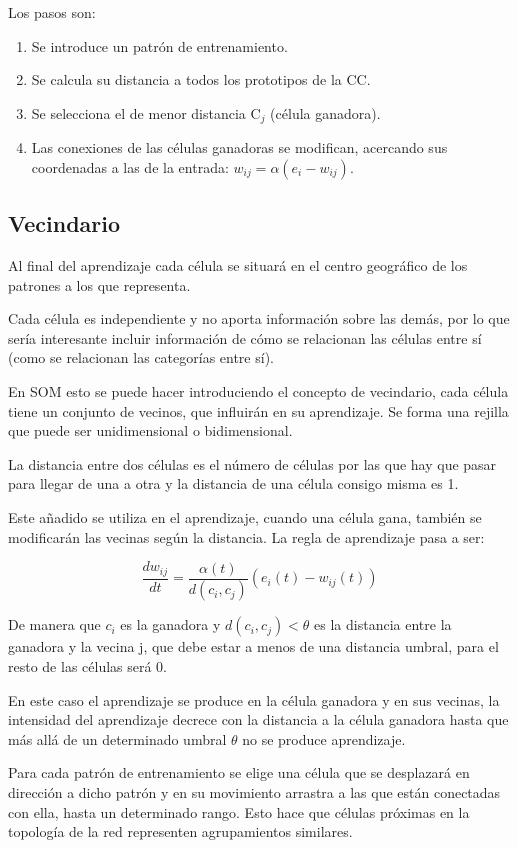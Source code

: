 \documentclass[12pt, twoside, openright]{report} %
\begin{document}
Los pasos son:
\begin{enumerate}
	\item Se introduce un patrón de entrenamiento.
	\item Se calcula su distancia a todos los prototipos de la CC.
	\item Se selecciona el de menor distancia C$_j$ (célula ganadora).
	\item Las conexiones de las células ganadoras se modifican, acercando sus coordenadas a las de la entrada: $w_{ij}=\alpha(e_i - w_{ij})$.
	
\end{enumerate}

\subsection{Vecindario}
Al final del aprendizaje cada célula se situará en el centro geográfico de los patrones a los que representa.

Cada célula es independiente y no aporta información sobre las demás, por lo que sería interesante incluir información de cómo se relacionan las células entre sí (como se relacionan las categorías entre sí).

En SOM esto se puede hacer introduciendo el concepto de vecindario, cada célula tiene un conjunto de vecinos, que influirán en su aprendizaje. Se forma una rejilla que puede ser unidimensional o bidimensional.

La distancia entre dos células es el número de células por las que hay que pasar para llegar de una a otra y la distancia de una célula consigo misma es 1.

Este añadido se utiliza en el aprendizaje, cuando una célula gana, también se modificarán las vecinas según la distancia. La regla de aprendizaje pasa a ser:

$$\frac{dw_{ij}}{dt}=\frac{\alpha(t)}{d(c_i, c_j)} (e_i(t)-w_{ij}(t))$$

De manera que $c_i$ es la ganadora y $d(c_i, c_j)<\theta$ es la distancia entre la ganadora y la vecina j, que debe estar a menos de una distancia umbral, para el resto de las células será 0.

En este caso el aprendizaje se produce en la célula ganadora y en sus vecinas, la intensidad del aprendizaje decrece con la distancia a la célula ganadora hasta que más allá de un determinado umbral $\theta$ no se produce aprendizaje.

Para cada patrón de entrenamiento se elige una célula que se desplazará en dirección a dicho patrón y en su movimiento arrastra a las que están conectadas con ella, hasta un determinado rango. Esto hace que células próximas en la topología de la red representen agrupamientos similares.
\end{document}
